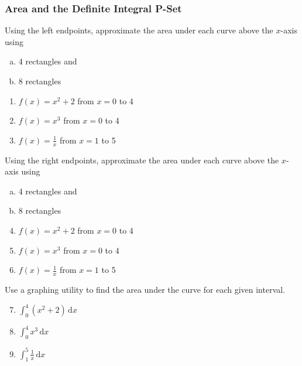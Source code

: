 \documentclass{article}
\begin{document}
\subsubsection*{Area and the Definite Integral P-Set}

Using the left endpoints, approximate the area under each curve above the $x$-axis using 
\begin{enumerate}[(a)]
    \item 4 rectangles and
    \item 8 rectangles
\end{enumerate}
\begin{multicols}{3}
\begin{enumerate}
    \item $f(x) = x^2 + 2$ from $x = 0$ to 4
    \item $f(x) = x^3$ from $x = 0$ to 4
    \item $f(x) = \frac{1}{x}$ from $x = 1$ to 5
\end{enumerate}
\end{multicols}

Using the right endpoints, approximate the area under each curve above the $x$-axis using 
\begin{enumerate}[(a)]
    \item 4 rectangles and
    \item 8 rectangles
\end{enumerate}
\begin{multicols}{3}
\begin{enumerate}   \setcounter{enumi}{3}
    \item $f(x) = x^2 + 2$ from $x = 0$ to 4
    \item $f(x) = x^3$ from $x = 0$ to 4
    \item $f(x) = \frac{1}{x}$ from $x = 1$ to 5
\end{enumerate}
\end{multicols}
\vspace{10pt}

Use a graphing utility to find the area under the curve for each given interval.
\begin{multicols}{3}
\begin{enumerate}   \setcounter{enumi}{6}
    \item $\int_{0}^{4} \left(x^2 + 2\right) \, \mathrm{d}x$
    \item $\int_{0}^{4} x^3 \, \mathrm{d}x$
    \item $\int_{1}^{5} \frac{1}{x} \, \mathrm{d}x$
\end{enumerate}
\end{multicols}
\vspace{10pt}
\end{document}
